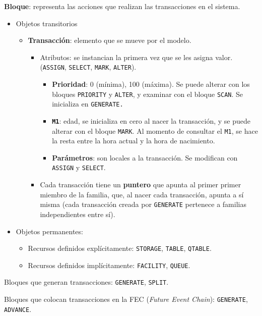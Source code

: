 \documentclass[12pt,a4paper, twoside]{paquetes-apunte/apunte}
\begin{document}
\textbf{Bloque}: representa las acciones que realizan las transacciones
en el sistema.
\begin{itemize}
\item Objetos transitorios

\begin{itemize}
\item \textbf{Transacción}: elemento que se mueve por el modelo.

\begin{itemize}
\item Atributos: se instancian la primera vez que se les asigna valor. (\texttt{ASSIGN},
\texttt{SELECT}, \texttt{MARK}, \texttt{ALTER}).

\begin{itemize}
\item \textbf{Prioridad}: 0 (mínima), 100 (máxima). Se puede alterar con
los bloques \texttt{PRIORITY} y \texttt{ALTER}, y examinar con el
bloque \texttt{SCAN}. Se inicializa en \texttt{GENERATE.}
\item \texttt{\textbf{M1}}: edad, se inicializa en cero al nacer la transacción,
y se puede alterar con el bloque \texttt{MARK}. Al momento de consultar
el \texttt{M1}, se hace la resta entre la hora actual y la hora de
nacimiento.
\item \textbf{Parámetros}: son locales a la transacción. Se modifican con
\texttt{ASSIGN} y \texttt{SELECT}.
\end{itemize}
\item Cada transacción tiene un \textbf{puntero} que apunta al primer primer
miembro de la familia, que, al nacer cada transacción, apunta a sí
misma (cada transacción creada por \texttt{GENERATE} pertenece a familias
independientes entre sí).
\end{itemize}
\end{itemize}
\item Objetos permanentes:

\begin{itemize}
\item Recursos definidos explícitamente: \texttt{STORAGE}, \texttt{TABLE},
\texttt{QTABLE}.
\item Recursos definidos implícitamente: \texttt{FACILITY}, \texttt{QUEUE}.
\end{itemize}
\end{itemize}
Bloques que generan transacciones: \texttt{GENERATE}, \texttt{SPLIT}.

Bloques que colocan transacciones en la FEC (\emph{Future Event Chain}):
\texttt{GENERATE}, \texttt{ADVANCE}.
\end{document}
